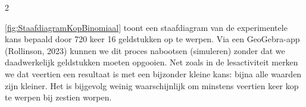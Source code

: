 \begin{multicols}{2}

\autoref{fig:StaafdiagramKopBinomiaal} toont een staafdiagram van de experimentele kans bepaald door 720 keer 16 geldstukken op te werpen. Via een GeoGebra-app (Rollinson, 2023) kunnen we dit proces nabootsen (simuleren) zonder dat we daadwerkelijk geldstukken moeten opgooien. Net zoals in de lesactiviteit merken we dat veertien een resultaat is met een bijzonder kleine kans: bijna alle waarden zijn kleiner. Het is bijgevolg weinig waarschijnlijk om minstens veertien keer kop te werpen bij zestien worpen. 

\end{multicols}


